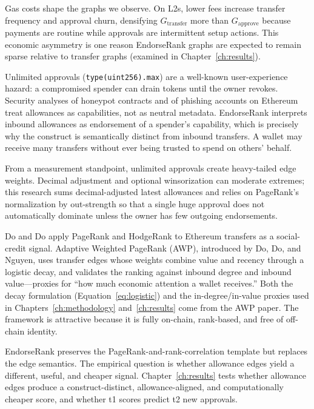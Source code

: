 Gas costs shape the graphs we observe. On L2s, lower fees increase transfer frequency and approval churn, densifying $G_{\text{transfer}}$ more than $G_{\text{approve}}$ because payments are routine while approvals are intermittent setup actions. This economic asymmetry is one reason EndorseRank graphs are expected to remain sparse relative to transfer graphs (examined in Chapter~\ref{ch:results}).


Unlimited approvals (\texttt{type(uint256).max}) are a well-known user-experience hazard: a compromised spender can drain tokens until the owner revokes. Security analyses of honeypot contracts  and of phishing accounts on Ethereum  treat allowances as capabilities, not as neutral metadata. EndorseRank interprets inbound allowances as endorsement of a spender's capability, which is precisely why the construct is semantically distinct from inbound transfers. A wallet may receive many transfers without ever being trusted to spend on others' behalf.

From a measurement standpoint, unlimited approvals create heavy-tailed edge weights. Decimal adjustment and optional winsorization can moderate extremes; this research sums decimal-adjusted latest allowances and relies on PageRank's normalization by out-strength so that a single huge approval does not automatically dominate unless the owner has few outgoing endorsements.


Do and Do apply PageRank and HodgeRank to Ethereum transfers as a social-credit signal. Adaptive Weighted PageRank (AWP), introduced by Do, Do, and Nguyen, uses transfer edges whose weights combine value and recency through a logistic decay, and validates the ranking against inbound degree and inbound value---proxies for ``how much economic attention a wallet receives.'' Both the decay formulation (Equation~\eqref{eq:logistic}) and the in-degree/in-value proxies used in Chapters~\ref{ch:methodology} and~\ref{ch:results} come from the AWP paper. The framework is attractive because it is fully on-chain, rank-based, and free of off-chain identity.

EndorseRank preserves the PageRank-and-rank-correlation template but replaces the edge semantics. The empirical question is whether allowance edges yield a different, useful, and cheaper signal. Chapter~\ref{ch:results} tests whether allowance edges produce a construct-distinct, allowance-aligned, and computationally cheaper score, and whether t1 scores predict t2 new approvals.

